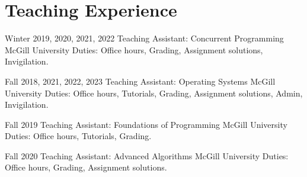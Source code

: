 
\section{Teaching Experience}


    \cventry
        {Winter 2019, 2020, 2021, 2022}
        {Teaching Assistant: Concurrent Programming}
        {McGill University}
        {}
        {}
        {Duties: Office hours, Grading, Assignment solutions, Invigilation.}

    \cventry
        {Fall 2018, 2021, 2022, 2023}
        {Teaching Assistant: Operating Systems}
        {McGill University}
        {}
        {}
        {Duties: Office hours, Tutorials, Grading, Assignment solutions, Admin, Invigilation.}

    \cventry
        {Fall 2019}
        {Teaching Assistant: Foundations of Programming}
        {McGill University}
        {}
        {}
        {Duties: Office hours, Tutorials, Grading.}

    \cventry
        {Fall 2020}
        {Teaching Assistant: Advanced Algorithms}
        {McGill University}
        {}
        {}
        {Duties: Office hours, Grading, Assignment solutions.}